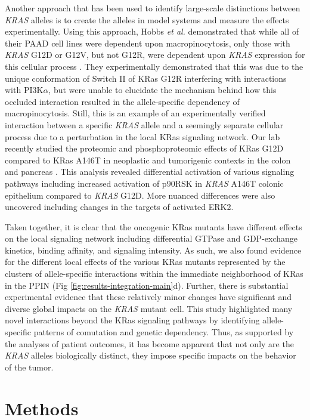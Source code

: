 \documentclass[english, 10pt, letterpaper]{article}
\newcommand{\KRAS}{\emph{KRAS}}
\newcommand{\kras}{KRas}
\begin{document}
Another approach that has been used to identify large-scale distinctions between \KRAS{} alleles is to create the alleles in model systems and measure the effects experimentally.
Using this approach, Hobbs \emph{et al.} demonstrated that while all of their PAAD cell lines were dependent upon macropinocytosis, only those with \KRAS{} G12D or G12V, but not G12R, were dependent upon \KRAS{} expression for this cellular process \cite{Hobbs2019AtypicalCancer.}.
They experimentally demonstrated that this was due to the unique conformation of Switch II of \kras{} G12R interfering with interactions with PI3K$\alpha$, but were unable to elucidate the mechanism behind how this occluded interaction resulted in the allele-specific dependency of macropinocytosis.
Still, this is an example of an experimentally verified interaction between a specific \KRAS{} allele and a seemingly separate cellular process due to a perturbation in the local \kras{} signaling network.
Our lab recently studied the proteomic and phosphoproteomic effects of \kras{} G12D compared to \kras{} A146T in neoplastic and tumorigenic contexts in the colon and pancreas \cite{Poulin2019}.
This analysis revealed differential activation of various signaling pathways including increased activation of p90RSK in \KRAS{} A146T colonic epithelium compared to \KRAS{} G12D.
More nuanced differences were also uncovered including changes in the targets of activated ERK2.

Taken together, it is clear that the oncogenic \kras{} mutants have different effects on the local signaling network including differential GTPase and GDP-exchange kinetics, binding affinity, and signaling intensity.
As such, we also found evidence for the different local effects of the various \kras{} mutants represented by the clusters of allele-specific interactions within the immediate neighborhood of \kras{} in the PPIN (Fig \ref{fig:results-integration-main}d).
Further, there is substantial experimental evidence that these relatively minor changes have significant and diverse global impacts on the \KRAS{} mutant cell.
This study highlighted many novel interactions beyond the \kras{} signaling pathways by identifying allele-specific patterns of comutation and genetic dependency.
Thus, as supported by the analyses of patient outcomes, it has become apparent that not only are the \KRAS{} alleles biologically distinct, they impose specific impacts on the behavior of the tumor.


\section*{Methods}
\end{document}
